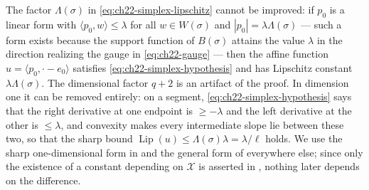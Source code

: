 \begin{remark}
\label{rem:ch22-simplex-constant}
The factor $\Lambda(\sigma)$ in
\eqref{eq:ch22-simplex-lipschitz} cannot be improved: if $p_0$ is a linear
form with $\langle p_0,w\rangle\leq\lambda$ for all $w\in W(\sigma)$ and
$|p_0|=\lambda\Lambda(\sigma)$ --- such a form exists because the support
function of $B(\sigma)$ attains the value $\lambda$ in the direction
realizing the gauge in \eqref{eq:ch22-gauge} --- then the affine function
$u=\langle p_0,\cdot-e_0\rangle$ satisfies
\eqref{eq:ch22-simplex-hypothesis} and has Lipschitz constant
$\lambda\Lambda(\sigma)$.  The dimensional factor $q+2$ is an artifact
of the proof.  In dimension one it can be removed entirely: on a segment,
\eqref{eq:ch22-simplex-hypothesis} says that the right derivative at one
endpoint is $\geq-\lambda$ and the left derivative at the other is
$\leq\lambda$, and convexity makes every intermediate slope lie between
these two, so that the sharp bound
$\operatorname{Lip}(u)\leq\Lambda(\sigma)\lambda=\lambda/\ell$ holds.  We
use the sharp one-dimensional form in
 and the general form of
 everywhere else; since only the existence of a
constant depending on $\mathcal X$ is asserted in
, nothing later depends on the
difference.
\end{remark}

